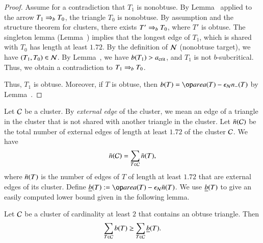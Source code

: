 \begin{proof} 
  Assume for a contradiction that $T_1$ is nonobtuse.  By
  Lemma~ applied to the arrow $T_1\Rightarrow_{b} T_0$, the
  triangle $T_0$ is nonobtuse.  By assumption and the structure
  theorem for clusters, there exists $T'\Rightarrow_{b} T_0$, where $T'$ is
  obtuse.  The singleton lemma (Lemma~) implies
  that the longest edge of $T_1$, which is shared with $T_0$ has
  length at least $1.72$.  By the definition of $\mathcal N$ (nonobtuse
  target), we have $(T_1,T_0)\in\mathcal N$.  By Lemma~, we have
  $b(T_1)>a_\text{crit}$, and $T_1$ is not $b$-subcritical.  Thus, we obtain
  a contradiction to $T_1\Rightarrow_{b} T_0$.

 Thus, $T_1$ is obtuse.
  Moreover, if $T$ is obtuse, then $b(T) = \area(T) -\epsN n_-(T)$ by
  Lemma~.
\end{proof}

Let $\mathcal C$ be a cluster.  By {\it external edge} of the cluster, we mean an
edge of a triangle in the cluster that is not shared with another
triangle in the cluster.  Let $\bar n(\mathcal C)$ be the total number of
external edges of length at least $1.72$ of the cluster $\mathcal C$.  We have
\[
\bar n(\mathcal C) =\sum_{T\in \mathcal C} \bar n(T),
\]
where $\bar n(T)$ is the number of edges of $T$ of length at least $1.72$
that are external edges of its cluster.
Define $\tb(T) := \area(T)-\epsN\tn(T)$.  We use $\underline{b}(T)$ to give an
easily computed lower bound given in the following lemma.

\begin{lemma} 
  Let $\mathcal C$ be a cluster of cardinality at least $2$ 
  that contains an obtuse triangle.
Then 
\[
\sum_{T\in\mathcal C} b(T)\ge \sum_{T\in\mathcal C} \underline{b}(T).
\]
\end{lemma}

